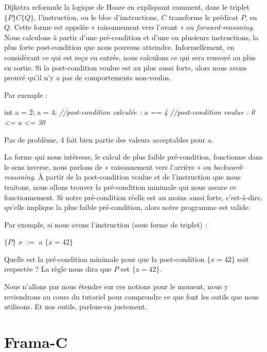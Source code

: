 \documentclass[12pt,francais,]{scrbook}
\newenvironment{Shaded}{}{}
\newcommand{\DataTypeTok}[1]{\textcolor[rgb]{0.56,0.13,0.00}{{#1}}}
\newcommand{\DecValTok}[1]{\textcolor[rgb]{0.25,0.63,0.44}{{#1}}}
\newcommand{\CommentTok}[1]{\textcolor[rgb]{0.38,0.63,0.69}{\textit{{#1}}}}
\newcommand{\NormalTok}[1]{{#1}}
\begin{document}
Dijkstra reformule la logique de Hoare en expliquant comment, dans le
triplet \(\{P\}C\{Q\}\), l'instruction, ou le bloc d'instructions, \(C\)
transforme le prédicat \(P\), en \(Q\). Cette forme est appelée «
raisonnement vers l'avant » ou \emph{forward-reasoning}. Nous calculons
à partir d'une pré-condition et d'une ou plusieurs instructions, la plus
forte post-condition que nous pouvons atteindre. Informellement, en
considérant ce qui est reçu en entrée, nous calculons ce qui sera
renvoyé au plus en sortie. Si la post-condition voulue est au plus aussi
forte, alors nous avons prouvé qu'il n'y a pas de comportements
non-voulus.

Par exemple :

\begin{footnotesize}\begin{Shaded}
\begin{Highlighting}[]
\DataTypeTok{int} \NormalTok{a = }\DecValTok{2}\NormalTok{;}
\NormalTok{a = }\DecValTok{4}\NormalTok{;}
\CommentTok{//post-condition calculée : a == 4}
\CommentTok{//post-condition voulue   : 0 <= a <= 30}
\end{Highlighting}
\end{Shaded}\end{footnotesize}

Pas de problème, 4 fait bien partie des valeurs acceptables pour a.

La forme qui nous intéresse, le calcul de plus faible pré-condition,
fonctionne dans le sens inverse, nous parlons de « raisonnement vers
l'arrière » ou \emph{backward-reasoning}. À partir de la post-condition
voulue et de l'instruction que nous traitons, nous allons trouver la
pré-condition minimale qui nous assure ce fonctionnement. Si notre
pré-condition réelle est au moins aussi forte, c'est-à-dire, qu'elle
implique la plus faible pré-condition, alors notre programme est valide.

Par exemple, si nous avons l'instruction (sous forme de triplet) :

\(\{P\}\) \(x\) \(:=\) a \(\{x = 42\}\)

Quelle est la pré-condition minimale pour que la post-condition
\(\{x = 42\}\) soit respectée ? La règle nous dira que \(P\) est
\(\{\)a\(=42\}\).

Nous n'allons pas nous étendre sur ces notions pour le moment, nous y
reviendrons au cours du tutoriel pour comprendre ce que font les outils
que nous utilisons. Et nos outils, parlons-en justement.

\section{Frama-C}\label{frama-c}
\end{document}
